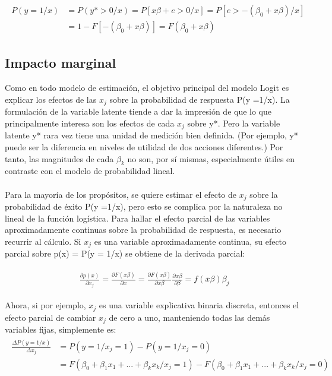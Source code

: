 \documentclass[11pt,fleqn]{book} %
\numberwithin{equation}{section} %
\numberwithin{figure}{section} %
\numberwithin{table}{section} %
\begin{document}
\begin{align} 
\begin{split}
P(y=1/x)   &=P(y*>0/x)=P[x\beta+e>0/x]=P[e>-(\beta_{0}+x\beta)/x]\\
&=1-F[-(\beta_{0}+x\beta)]=F(\beta_{0}+x\beta)
\end{split}					
\end{align}

\subsection{Impacto marginal}

Como en todo modelo de estimación,  el objetivo principal del modelo Logit es explicar los efectos de las $x_{j}$ sobre la probabilidad de respuesta P(y =1/x). La formulación de la variable latente tiende a dar la impresión de que lo que principalmente interesa son los  efectos de cada $x_{j}$ sobre y*. Pero la variable latente y* rara vez tiene una unidad de medición bien definida. (Por ejemplo, y* puede ser la diferencia en niveles de utilidad de dos acciones diferentes.) Por tanto, las magnitudes de cada $\beta _{k}$ no son, por sí mismas, especialmente útiles en contraste con el modelo de probabilidad lineal.
\\\\
Para la mayoría de los propósitos, se quiere estimar el efecto de $x_{j}$ sobre la probabilidad de éxito P(y =1/x), pero esto se complica por la naturaleza no lineal de la función logística. 
Para hallar el efecto parcial de las variables aproximadamente continuas sobre la probabilidad de respuesta, es necesario recurrir al cálculo. Si $x_{j}$ es una variable aproximadamente continua, su efecto parcial sobre p(x) = P(y = 1/x) se obtiene de la derivada parcial:

\begin{align} 
\begin{split}
\frac{\partial p(x)}{\partial x_{j}}=\frac{\partial F(x\beta)}{\partial x}=\frac{\partial F(x\beta)}{\partial x\beta}\frac{\partial x\beta}{\partial \beta}=f(\overline{x}\beta)\beta _{j}
\end{split}					
\end{align}

Ahora, si por ejemplo, $x_{j}$ es una variable explicativa binaria discreta, entonces el efecto parcial de cambiar $x_{j}$ de cero a uno, manteniendo todas las demás variables fijas, simplemente es:
\begin{align} 
\begin{split}
\frac{\Delta P(y=1/x) }{\Delta x_{j}}   &=P(y=1/x_{j}=1)-P(y=1/x_{j}=0)\\
&=F(\beta _{0}+\beta _{1}x_{1}+...+\beta _{k}x_{k}/x_{j}=1)-F(\beta _{0}+\beta _{1}x_{1}+...+\beta _{k}x_{k}/x_{j}=0)
\end{split}					
\end{align}
\end{document}
